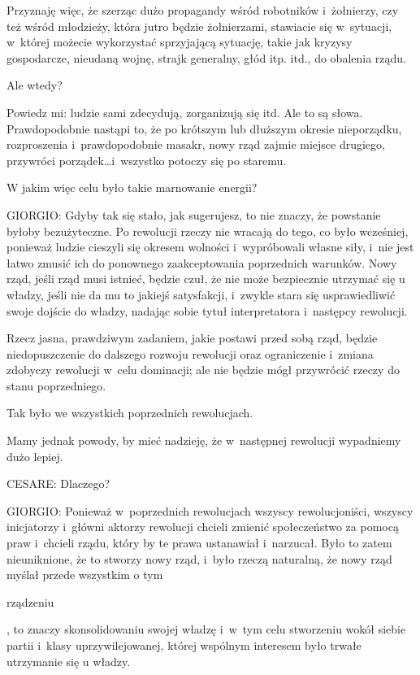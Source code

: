 \documentclass[oneside,polish,11pt,sfheadings]{mwbk}
\begin{document}
 
Przyznaję więc, że szerząc dużo propagandy wśród robotników i~żołnierzy, czy też wśród młodzieży, która jutro będzie
żołnierzami, stawiacie się w~sytuacji, w~której możecie wykorzystać sprzyjającą sytuację, takie jak kryzysy
gospodarcze, nieudaną wojnę, strajk generalny, głód itp. itd., do obalenia rządu. 

 
Ale wtedy? 

 
Powiedz mi: ludzie sami zdecydują, zorganizują się itd.  Ale to są słowa. Prawdopodobnie nastąpi to, że po krótszym lub
dłuższym okresie nieporządku, rozproszenia i~prawdopodobnie masakr, nowy rząd zajmie miejsce drugiego, przywróci
porządek\ldots i~wszystko potoczy się po staremu. 

 
W jakim więc celu było takie marnowanie energii? 




 
\noindent GIORGIO: Gdyby tak się stało, jak sugerujesz, to nie znaczy, że powstanie byłoby bezużyteczne. Po rewolucji rzeczy nie
wracają do tego, co było wcześniej, ponieważ ludzie cieszyli się okresem wolności i~wypróbowali własne siły, i~nie jest
łatwo zmusić ich do ponownego zaakceptowania poprzednich warunków. Nowy rząd, jeśli rząd musi istnieć, będzie czuł, że
nie może bezpiecznie utrzymać się u władzy, jeśli nie da mu to jakiejś satysfakcji, i~zwykle stara się usprawiedliwić
swoje dojście do władzy, nadając sobie tytuł interpretatora i~następcy rewolucji. 

 
Rzecz jasna, prawdziwym zadaniem, jakie postawi przed sobą rząd, będzie niedopuszczenie do dalszego rozwoju rewolucji
oraz ograniczenie i~zmiana zdobyczy rewolucji w~celu dominacji; ale nie będzie mógł przywrócić rzeczy do stanu
poprzedniego. 

 
Tak było we wszystkich poprzednich rewolucjach. 

 
Mamy jednak powody, by mieć nadzieję, że w~następnej rewolucji wypadniemy dużo lepiej. 




 
\noindent CESARE: Dlaczego? 




 
\noindent GIORGIO: Ponieważ w~poprzednich rewolucjach wszyscy rewolucjoniści, wszyscy inicjatorzy i~główni aktorzy rewolucji
chcieli zmienić społeczeństwo za pomocą praw i~chcieli rządu, który by te prawa ustanawiał i~narzucał. Było to zatem
nieuniknione, że to stworzy nowy rząd, i~było rzeczą naturalną, że nowy rząd myślał przede wszystkim o tym
\begin{itshape}rządzeniu \end{itshape}, to znaczy skonsolidowaniu swojej władzę i~w~tym celu
stworzeniu wokół siebie partii i~klasy uprzywilejowanej, której wspólnym interesem było trwałe utrzymanie się u
władzy. 
\end{document}
